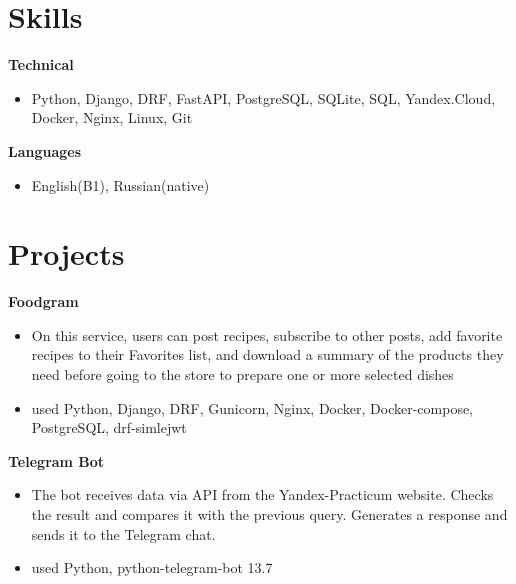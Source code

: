 \documentclass{clean_cv}
\begin{document}
\begin{datetabular}{9em}
\end{datetabular}




\section{Skills}

\textbf{Technical}
 \begin{itemize}
   \item Python, Django, DRF, FastAPI, PostgreSQL, SQLite, SQL, Yandex.Cloud, Docker, Nginx, Linux, Git
   \end{itemize}
   \vspace{0.5cm}
   
\textbf{Languages}
 \begin{itemize}
   \item English(B1), Russian(native)
   \end{itemize}
   \vspace{0.5cm}
\section{Projects}

\textbf{Foodgram}\href{https://github.com/Chinpakamon/foodgram-project-react}{\color{blue}}
 \begin{itemize}
   \item  On this service, users can post recipes, subscribe to other posts, add favorite recipes to their Favorites list, and download a summary of the products they need before going to the store to prepare one or more selected dishes
   \item used Python, Django, DRF, Gunicorn, Nginx, Docker, Docker-compose, PostgreSQL, drf-simlejwt
   \end{itemize}
   \vspace{0.5cm}
   
   \textbf{Telegram Bot}\href{https://github.com/Chinpakamon/homework_bot}{\color{blue}}
 \begin{itemize}
   \item  The bot receives data via API from the Yandex-Practicum website. Checks the result and compares it with the previous query. Generates a response and sends it to the Telegram chat.
   \item used Python, python-telegram-bot 13.7
   \end{itemize}
   \vspace{0.5cm}
   
\end{document}
